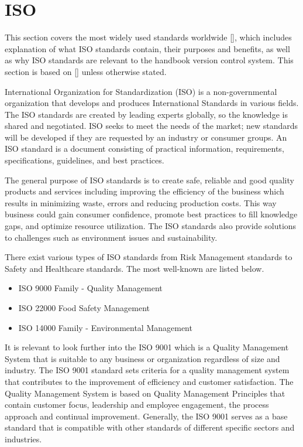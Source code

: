 \section{ISO}
This section covers the most widely used standards worldwide [], which includes explanation of what ISO standards contain, their purposes and benefits, as well as why ISO standards are relevant to the handbook version control system. This section is based on [] unless otherwise stated.

International Organization for Standardization (ISO) is a non-governmental organization that develops and produces International Standards in various fields. The ISO standards are created by leading experts globally, so the knowledge is shared and negotiated. ISO seeks to meet the needs of the market; new standards will be developed if they are requested by an industry or consumer groups. An ISO standard is a document consisting of practical information, requirements, specifications, guidelines, and best practices. 

The general purpose of ISO standards is to create safe, reliable and good quality products and services including improving the efficiency of the business which results in minimizing waste, errors and reducing production costs. This way business could gain consumer confidence, promote best practices to fill knowledge gaps, and optimize resource utilization. The ISO standards also provide solutions to challenges such as environment issues and sustainability. 

There exist various types of ISO standards from Risk Management standards to Safety and Healthcare standards. The most well-known are listed below.

\begin{itemize}
	\item ISO 9000 Family - Quality Management
	\item ISO 22000 Food Safety Management
	\item ISO 14000 Family - Environmental Management

\end{itemize}

It is relevant to look further into the ISO 9001 which is a Quality Management System that is suitable to any business or organization regardless of size and industry. The ISO 9001 standard sets criteria for a quality management system that contributes to the improvement of efficiency and customer satisfaction. The Quality Management System is based on Quality Management Principles that contain customer focus, leadership and employee engagement, the process approach and continual improvement. Generally, the ISO 9001 serves as a base standard that is compatible with other standards of different specific sectors and industries.

